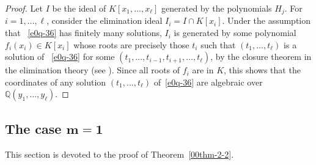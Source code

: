 \documentclass[pdftex]{sigma}
\numberwithin{equation}{section}
\def\Q{\mathbb Q}
\begin{document}
\begin{proof} Let $I$ be the ideal of $K[x_1,\dots,x_\ell]$ generated
 by the polynomials $H_j$. For $i=1,\dots,\ell$, consider the
 elimination ideal $I_i=I\cap K[x_i]$. Under the assumption that
~\eqref{e0q-36} has finitely many solutions, $I_i$ is generated by
 some polynomial $f_i(x_i)\in K[x_i]$ whose roots are precisely those
 $t_i$ such that $(t_1,\dots,t_\ell)$ is a solution of
~\eqref{e0q-36} for some $(t_1,\dots,t_{i-1},t_{i+1},\dots,t_\ell)$,
 by the closure theorem in the elimination theory (see \cite[Theorem
 3, Section 3.3]{Cox}). Since all roots of $f_i$ are in $K$, this
 shows that the coordinates of any solution
 $(t_1,\dots,t_\ell)$ of~\eqref{e0q-36} are algebraic over
 $\Q(y_1,\dots,y_\ell)$.
\end{proof}

\subsection[The case m=1]{The case $\boldsymbol{m=1}$}
This section is devoted to the proof of Theorem~\ref{00thm-2-2}.
\end{document}
